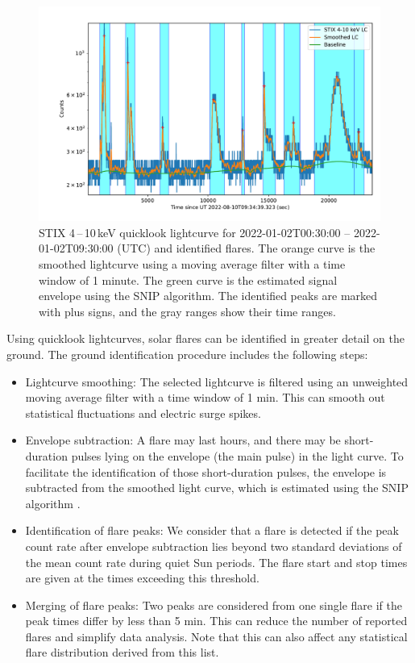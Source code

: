 \documentclass[referee]{preaa} %
\begin{document}
\begin{figure}
  \centering
  \includegraphics[width=0.8\linewidth]{figures/flaredet.pdf} %
  \caption{STIX 4\,--\,10\,keV quicklook lightcurve for 2022-01-02T00:30:00 -- 2022-01-02T09:30:00 (UTC) and  identified flares. The orange curve is the smoothed lightcurve using a moving average filter with a time window of 1 minute. The green curve is the estimated signal envelope using the SNIP algorithm.  The identified peaks are marked with plus signs, and the gray ranges show their time ranges.
  }
  \label{fig:flare-det}
\end{figure}
Using quicklook lightcurves, solar flares can be identified in greater detail on the ground. 
The ground identification procedure includes the following steps:
\begin{itemize}
  \item Lightcurve smoothing: The selected lightcurve is filtered using an unweighted moving average filter with a time window of 1 min. This can smooth out statistical fluctuations and electric surge spikes.
  \item Envelope subtraction: A flare may last hours, and there may be short-duration pulses lying on the envelope (the main pulse) in the light curve.  To facilitate the identification of those short-duration pulses, the envelope is subtracted from the smoothed light curve, which is estimated using the SNIP algorithm \citep{snip}. 
  \item Identification of flare peaks: We consider that a flare is detected if the peak count rate after envelope subtraction lies beyond two standard deviations of the mean count rate during quiet Sun periods. The flare start and stop times are given at the times exceeding this threshold.  
  \item Merging of flare peaks: Two peaks are considered from one single flare if the peak times differ by less than 5 min. This can reduce the number of reported flares and simplify data analysis. Note that this can also affect any statistical flare distribution derived from this list.
\end{itemize}
\end{document}
